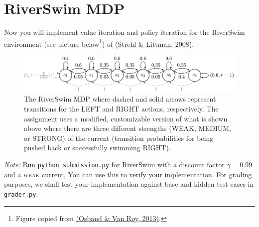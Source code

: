 \section{RiverSwim MDP}

Now you will implement value iteration and policy iteration for the RiverSwim environment (see picture below\footnote{Figure copied from \href{https://proceedings.neurips.cc/paper/2013/hash/6a5889bb0190d0211a991f47bb19a777-Abstract.html}{(Osband \& Van Roy, 2013)}.}) of \href{https://www.sciencedirect.com/science/article/pii/S0022000008000767}{(Strehl \& Littman, 2008)}.

\begin{figure}[h]
  \centering
  \includegraphics[width=\linewidth]{images/RiverSwim.png}
  \caption{The RiverSwim MDP where dashed and solid arrows represent transitions for the \textsc{LEFT} and \textsc{RIGHT} actions, respectively. The assignment uses a modified, customizable version of what is shown above where there are three different strengths (\textsc{WEAK}, \textsc{MEDIUM}, or \textsc{STRONG}) of the current (transition probabilities for being pushed back or successfully swimming \textsc{RIGHT}).}
  \label{fig:riverswim}
\end{figure}

\textit{Note:} Run \texttt{python submission.py} for RiverSwim with a discount factor $\gamma = 0.99$ and a \textsc{weak} current, You can use this to verify your implementation. For grading purposes, we shall test your implementation against base and hidden test cases in \texttt{grader.py}.

\begin{enumerate}[(a)]

  

  

  

  

  

  

\end{enumerate}